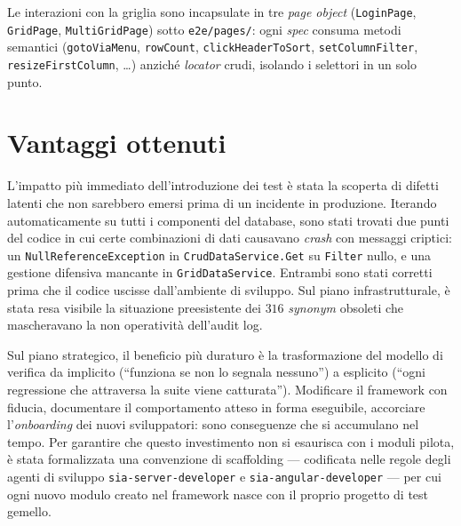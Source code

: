 Le interazioni con la griglia sono incapsulate in tre \emph{page object}
(\texttt{LoginPage}, \texttt{GridPage}, \texttt{MultiGridPage}) sotto
\texttt{e2e/pages/}: ogni \emph{spec} consuma metodi semantici
(\texttt{gotoViaMenu}, \texttt{rowCount}, \texttt{clickHeaderToSort},
\texttt{setColumnFilter}, \texttt{resizeFirstColumn}, \dots) anziché \emph{locator}
crudi, isolando i selettori in un solo punto.

\section{Vantaggi ottenuti}

L'impatto più immediato dell'introduzione dei test è stata la scoperta di difetti
latenti che non sarebbero emersi prima di un incidente in produzione. Iterando
automaticamente su tutti i componenti del database, sono stati trovati due punti del
codice in cui certe combinazioni di dati causavano \emph{crash} con messaggi criptici:
un \texttt{NullReferenceException} in \texttt{CrudDataService.Get} su
\texttt{Filter} nullo, e una gestione difensiva mancante in \texttt{GridDataService}.
Entrambi sono stati corretti prima che il codice uscisse dall'ambiente di sviluppo.
Sul piano infrastrutturale, è stata resa visibile la situazione preesistente dei
$316$ \emph{synonym} obsoleti che mascheravano la non operatività dell'audit log.

Sul piano strategico, il beneficio più duraturo è la trasformazione del modello di
verifica da implicito (``funziona se non lo segnala nessuno'') a esplicito (``ogni
regressione che attraversa la suite viene catturata''). Modificare il framework con
fiducia, documentare il comportamento atteso in forma eseguibile, accorciare
l'\emph{onboarding} dei nuovi sviluppatori: sono conseguenze che si accumulano nel
tempo. Per garantire che questo investimento non si esaurisca con i moduli pilota, è
stata formalizzata una convenzione di scaffolding --- codificata nelle regole
degli agenti di sviluppo \texttt{sia-server-developer} e \texttt{sia-angular-developer}
--- per cui ogni nuovo modulo creato nel framework nasce con il proprio progetto di
test gemello.
